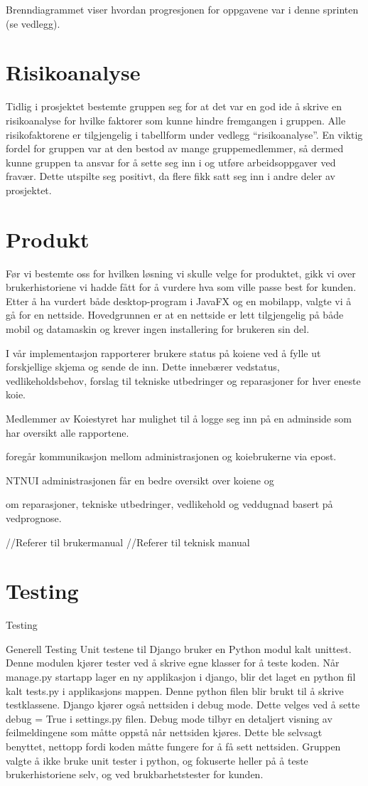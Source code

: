 \documentclass[12pt,a4paper,norsk]{article}
\begin{document}
Brenndiagrammet viser hvordan progresjonen for oppgavene var i denne sprinten (se vedlegg).

	
	\section{Risikoanalyse}
	Tidlig i prosjektet bestemte gruppen seg for at det var en god ide å skrive en risikoanalyse for hvilke faktorer som kunne hindre fremgangen i gruppen. Alle risikofaktorene er tilgjengelig i tabellform under vedlegg “risikoanalyse”. En viktig fordel for gruppen var at den bestod av mange gruppemedlemmer, så dermed kunne gruppen ta ansvar for å sette seg inn i og utføre arbeidsoppgaver ved fravær. Dette utspilte seg positivt, da flere fikk satt seg inn i andre deler av prosjektet.
	
	\section{Produkt}
	Før vi bestemte oss for hvilken løsning vi skulle velge for produktet, gikk vi over brukerhistoriene vi hadde fått for å vurdere hva som ville passe best for kunden. Etter å ha vurdert både desktop-program i JavaFX og en mobilapp, valgte vi å gå for en nettside. Hovedgrunnen er at en nettside er lett tilgjengelig på både mobil og datamaskin og krever ingen installering for brukeren sin del.
	
	I vår implementasjon rapporterer brukere status på koiene ved å fylle ut forskjellige skjema og sende de inn. Dette innebærer vedstatus, vedlikeholdsbehov, forslag til tekniske utbedringer og reparasjoner for hver eneste koie. 
	
	Medlemmer av Koiestyret har mulighet til å logge seg inn på en adminside som har oversikt alle rapportene. 
	
	foregår kommunikasjon mellom administrasjonen og koiebrukerne via epost.

    NTNUI administrasjonen får en bedre oversikt over koiene og
    
    om reparasjoner, tekniske utbedringer, vedlikehold og veddugnad basert på vedprognose.
    
	
	//Referer til brukermanual
	//Referer til teknisk manual
	
	\section{Testing}
	Testing

Generell Testing
Unit testene til Django bruker en Python modul kalt unittest. Denne modulen kjører tester ved å skrive egne klasser for å teste koden. Når manage.py startapp lager en ny applikasjon i django, blir det laget en python fil kalt tests.py i applikasjons mappen. Denne python filen blir brukt til å skrive testklassene. Django kjører også nettsiden i debug mode. Dette velges ved å sette debug = True i settings.py filen. Debug mode tilbyr en detaljert visning av feilmeldingene som måtte oppstå når nettsiden kjøres. Dette ble selvsagt benyttet, nettopp fordi koden måtte fungere for å få sett nettsiden. Gruppen valgte å ikke bruke unit tester i python, og fokuserte heller på å teste brukerhistoriene selv, og ved brukbarhetstester for kunden.
\end{document}
